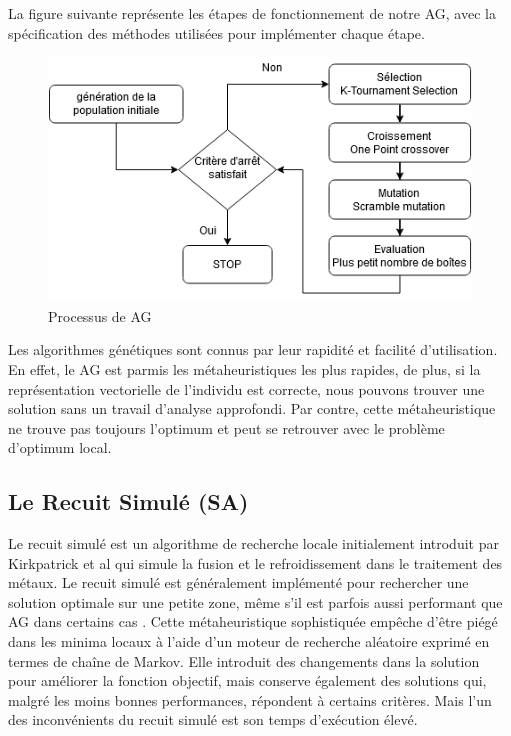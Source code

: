 \documentclass[preprint]{elsarticle}
\begin{document}
La figure suivante représente les étapes de fonctionnement de notre AG, avec la spécification des méthodes utilisées pour implémenter chaque étape. 

\begin{figure}[!h]
    \centering
    \includegraphics[scale=0.6]{./figures/AG schema.png}
    \caption{Processus de AG }
    \label{fig:agschema}
\end{figure}
Les algorithmes génétiques sont connus par leur rapidité et facilité d’utilisation. 
En effet, le AG est parmis les métaheuristiques les plus rapides, de plus, si la représentation vectorielle de l'individu est correcte, nous pouvons trouver une solution sans un travail d'analyse approfondi. Par contre, cette métaheuristique ne trouve pas toujours l’optimum et peut se retrouver avec le problème d’optimum local. 

\subsection{Le Recuit Simulé (SA)}
Le recuit simulé est un algorithme de recherche locale initialement introduit par Kirkpatrick et al \cite{kirk} qui simule la fusion et le refroidissement dans le traitement des métaux. Le recuit simulé est généralement implémenté pour rechercher une solution optimale sur une petite zone, même s'il est parfois aussi performant que AG dans certains cas \cite{Alkhateeb}.
Cette métaheuristique sophistiquée empêche d'être piégé dans les minima locaux à l'aide d'un moteur de recherche aléatoire exprimé en termes de chaîne de Markov. Elle introduit des changements dans la solution pour améliorer la fonction objectif, mais conserve également des solutions qui, malgré les moins bonnes performances, répondent à certains critères. Mais l’un des inconvénients du recuit simulé est son temps d'exécution élevé. 
\end{document}
